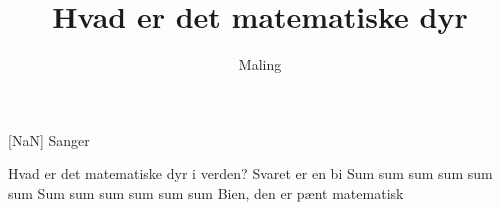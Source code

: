 \documentclass[a4paper,11pt]{article}
\title{Hvad er det matematiske dyr}
\author{Maling}
\begin{document}
\maketitle

\begin{roles}
[NaN] Sanger
\end{roles}

\begin{song}
 Hvad er det matematiske dyr i verden?
Svaret er en bi
Sum sum sum sum sum sum
Sum sum sum sum sum sum
Bien, den er pænt matematisk
\end{song}
\end{document}

